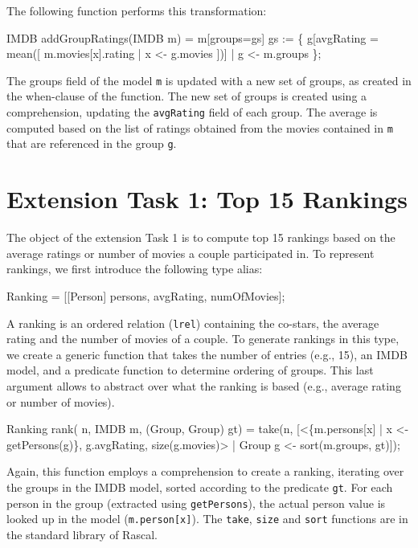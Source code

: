 \documentclass[submission,copyright,creativecommons]{eptcs}
\begin{document}
The following function performs this transformation:
\begin{rascal}
IMDB addGroupRatings(IMDB m) = m{}[groups=gs]
   gs := \{{} g{}[avgRating = mean([ m.movies{}[x].rating | x \textless{}- g.movies ])] 
                | g \textless{}- m.groups \}{};
\end{rascal}

The groups field of the model \texttt{m} is updated with a new set of groups, as created in the when-clause of the function. 
The new set of groups is created using a comprehension, updating the \texttt{avgRating} field of each group. 
The average is computed based on the list of ratings obtained from the movies contained in \texttt{m} that are referenced in the group \texttt{g}. 

\section*{Extension Task 1: Top 15 Rankings}

The object of the extension Task 1 is to compute top 15 rankings based on the average ratings or number of movies a couple participated in. 
To represent rankings, we first introduce the following type alias:

\begin{rascal}
 Ranking = [[Person] persons,  avgRating,  numOfMovies]; 
\end{rascal}

A ranking is an ordered relation (\texttt{lrel}) containing the co-stars, the average rating and the number of movies of a couple. 
To generate rankings in this type, we create a generic function that takes the number of entries (e.g., 15), an IMDB model, and a predicate function to determine ordering of groups. This last argument allows to abstract over what the ranking is based (e.g., average rating or number of movies). 

\begin{rascal}
Ranking rank( n, IMDB m, (Group, Group) gt) =
    take(n, 
       {}[\textless{}\{{}m.persons{}[x] | x \textless{}- getPersons(g)\}{}, g.avgRating, size(g.movies)\textgreater{} 
            | Group g \textless{}- sort(m.groups, gt)]);
\end{rascal}    

Again, this function employs a comprehension to create a ranking, iterating over the groups in the IMDB model, sorted according to the predicate \texttt{gt}. For each person in the group (extracted using \texttt{getPersons}), the actual person value is looked up in the model (\texttt{m.person[x]}). The \texttt{take}, \texttt{size} and \texttt{sort} functions are in the standard library of Rascal.  
\end{document}
